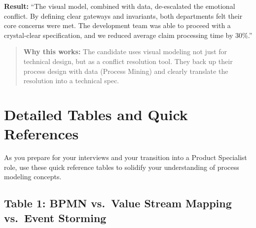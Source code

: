 \textbf{Result:} ``The visual model, combined with data, de-escalated
the emotional conflict. By defining clear gateways and invariants, both
departments felt their core concerns were met. The development team was
able to proceed with a crystal-clear specification, and we reduced
average claim processing time by 30\%.''

\begin{quote}
\textbf{Why this works:} The candidate uses visual modeling not just for
technical design, but as a conflict resolution tool. They back up their
process design with data (Process Mining) and clearly translate the
resolution into a technical spec.
\end{quote}

\bigskip

\section{Detailed Tables and Quick
References}\label{detailed-tables-and-quick-references}

As you prepare for your interviews and your transition into a Product
Specialist role, use these quick reference tables to solidify your
understanding of process modeling concepts.

\subsection{Table 1: BPMN vs.~Value Stream Mapping vs.~Event
Storming}\label{table-1-bpmn-vs.-value-stream-mapping-vs.-event-storming}


